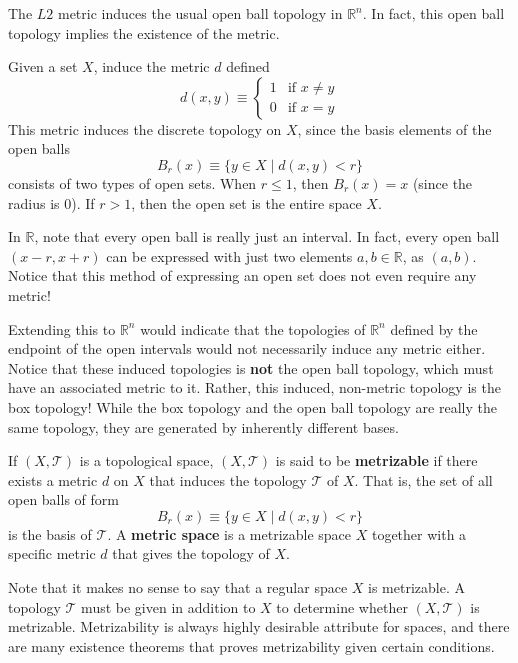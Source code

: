 \documentclass{article}
\begin{document}
    \begin{example}
    The $L2$ metric induces the usual open ball topology in $\mathbb{R}^n$. In fact, this open ball topology implies the existence of the metric. 
    \end{example}

    \begin{example}
    Given a set $X$, induce the metric $d$ defined
    \[d(x, y) \equiv \begin{cases}
          1 & \text{if } x \neq y \\
          0 & \text{if } x = y
    \end{cases}\]
    This metric induces the discrete topology on $X$, since the basis elements of the open balls
    \[B_r (x) \equiv \{ y \in X \; | \; d(x, y) <r\}\]
    consists of two types of open sets. When $r \leq 1$, then $B_r (x) = x$ (since the radius is $0$). If $r > 1$, then the open set is the entire space $X$. 
    \end{example}

    In $\mathbb{R}$, note that every open ball is really just an interval. In fact, every open ball $(x - r, x + r)$ can be expressed with just two elements $a, b \in \mathbb{R}$, as $(a, b)$. Notice that this method of expressing an open set does not even require any metric! 

    Extending this to $\mathbb{R}^n$ would indicate that the topologies of $\mathbb{R}^n$ defined by the endpoint of the open intervals would not necessarily induce any metric either. Notice that these induced topologies is \textbf{not} the open ball topology, which must have an associated metric to it. Rather, this induced, non-metric topology is the box topology! While the box topology and the open ball topology are really the same topology, they are generated by inherently different bases. 

    \begin{definition}
    If $(X, \mathscr{T})$ is a topological space, $(X, \mathscr{T})$ is said to be \textbf{metrizable} if there exists a metric $d$ on $X$ that induces the topology $\mathscr{T}$ of $X$. That is, the set of all open balls of form
    \[B_r (x) \equiv \{ y \in X \; | \; d(x, y) < r \}\]
    is the basis of $\mathscr{T}$. A \textbf{metric space} is a metrizable space $X$ together with a specific metric $d$ that gives the topology of $X$. 
    \end{definition}

    Note that it makes no sense to say that a regular space $X$ is metrizable. A topology $\mathscr{T}$ must be given in addition to $X$ to determine whether $(X, \mathscr{T})$ is metrizable. Metrizability is always highly desirable attribute for spaces, and there are many existence theorems that proves metrizability given certain conditions. 
\end{document}
